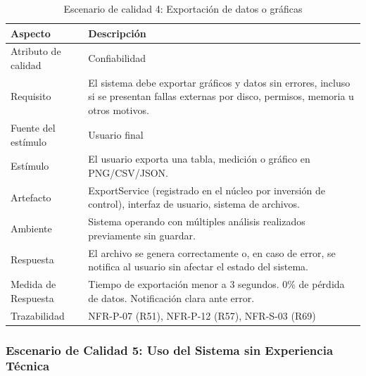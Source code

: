 \documentclass[11pt,a4paper]{article}
\DeclareRobustCommand{\_}{\textunderscore\allowbreak}
\begin{document}
\begin{table}[H]
\centering
\caption{Escenario de calidad 4: Exportación de datos o gráficas}
\label{tab:escenario4}
\begin{tabularx}{\textwidth}{|l|X|}
\hline
\textbf{Aspecto} & \textbf{Descripción} \\
\hline
Atributo de calidad & Confiabilidad \\
\hline
Requisito & El sistema debe exportar gráficos y datos sin errores, incluso si se presentan fallas externas por disco, permisos, memoria u otros motivos. \\
\hline
Fuente del estímulo & Usuario final \\
\hline
Estímulo & El usuario exporta una tabla, medición o gráfico en PNG/CSV/JSON. \\
\hline
Artefacto & ExportService (registrado en el núcleo por inversión de control), interfaz de usuario, sistema de archivos. \\
\hline
Ambiente & Sistema operando con múltiples análisis realizados previamente sin guardar. \\
\hline
Respuesta & El archivo se genera correctamente o, en caso de error, se notifica al usuario sin afectar el estado del sistema. \\
\hline
Medida de Respuesta & Tiempo de exportación menor a 3 segundos. 0\% de pérdida de datos. Notificación clara ante error. \\
\hline
Trazabilidad & NFR-P-07 (R51), NFR-P-12 (R57), NFR-S-03 (R69) \\
\hline
\end{tabularx}
\end{table}

\subsubsection{Escenario de Calidad 5: Uso del Sistema sin Experiencia Técnica}
\end{document}
